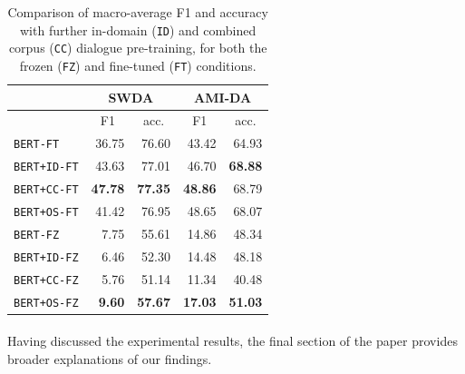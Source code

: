 \documentclass[11pt,a4paper]{article}
\begin{document}
\begin{table}[]
\begin{tabular}{@{}lrrrr@{}}
\toprule
           & \multicolumn{2}{c}{SWDA}                          & \multicolumn{2}{c}{AMI-DA}                        \\ \midrule
           & \multicolumn{1}{c}{F1} & \multicolumn{1}{c}{acc.} & \multicolumn{1}{c}{F1} & \multicolumn{1}{c}{acc.} \\
\texttt{BERT-FT}    & 36.75                  & 76.60                    & 43.42                  & 64.93                    \\
\texttt{BERT+ID-FT} & 43.63                  & 77.01                    & 46.70                  & \textbf{68.88}           \\
\texttt{BERT+CC-FT} & \textbf{47.78}         & \textbf{77.35}           & \textbf{48.86}         & 68.79                    \\ 
\texttt{BERT+OS-FT} & 41.42                  & 76.95                    & 48.65                  & 68.07                    \\ \midrule
\texttt{BERT-FZ}    &  7.75                  & 55.61           & 14.86                  & 48.34                    \\
\texttt{BERT+ID-FZ} &  6.46                  & 52.30                    & 14.48                  & 48.18                    \\
\texttt{BERT+CC-FZ} &  5.76                  & 51.14                    & 11.34                  & 40.48                    \\ 
\texttt{BERT+OS-FZ} &  \textbf{9.60}         & \textbf{57.67}           & \textbf{17.03}         & \textbf{51.03}           \\ \bottomrule
\end{tabular}
  \caption{Comparison of macro-average F1 and accuracy  with further in-domain (\texttt{ID}) and combined corpus (\texttt{CC}) dialogue pre-training,
    for both the frozen (\texttt{FZ}) and fine-tuned (\texttt{FT}) conditions.}
  \label{table:exp3}
\end{table}


\paragraph{}
Having discussed the experimental results, the final section of the paper provides broader explanations of our findings.
\end{document}
